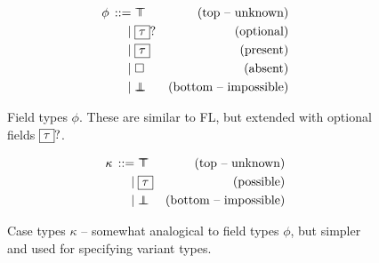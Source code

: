 \begin{figure}[p]
    \centering
\begin{align*}
\graintro \phi 
\flftop 
& \text{(top -- unknown)}
\graitem 
\fbopt \tau 
& \text{(optional)}
\graitem 
\flpresent \tau 
& \text{(present)}
\graitem 
\flabsent 
& \text{(absent)}
\graitem 
\flfbot
& \text{(bottom -- impossible)}
\end{align*}
    \caption{Field types $\phi$. These are similar to FL, but extended with optional fields $\boxed{\tau}?$.}
    \label{fig:fabric-fields}
\end{figure}

\begin{figure}[p]
    \centering
\begin{align*}
\graintro \kappa 
\flftop 
& \text{(top -- unknown)}
\graitem
\flpresent \tau
& \text{(possible)}
\graitem
\flfbot 
& \text{(bottom -- impossible)}
\end{align*}
    \caption{Case types $\kappa$ -- somewhat analogical to field types $\phi$, but simpler and used for specifying variant types.}
    \label{fig:fabric-cases}
\end{figure}

